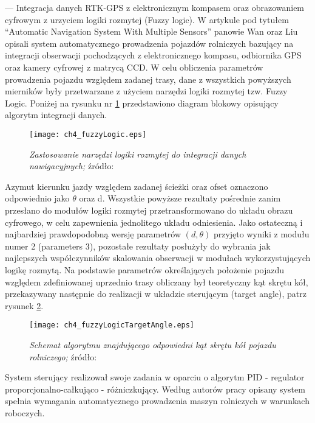 --- Integracja danych RTK-GPS z elektronicznym kompasem oraz obrazowaniem cyfrowym z urzyciem logiki rozmytej (Fuzzy logic).
W artykule pod tytułem “Automatic Navigation System With Multiple Sensors” panowie Wan oraz Liu
opisali system automatycznego prowadzenia pojazdów rolniczych bazujący na integracji obserwacji pochodzących z elektronicznego kompasu,
odbiornika GPS oraz kamery cyfrowej z matrycą CCD. W celu obliczenia parametrów prowadzenia pojazdu względem zadanej trasy,
dane z wszystkich powyższych mierników były przetwarzane z użyciem narzędzi logiki rozmytej tzw. Fuzzy Logic.
Poniżej na rysunku nr \ref{fig:ch4_fuzzyLogic} przedstawiono diagram blokowy opisujący algorytm integracji danych.
\begin{figure}[H]
\centering
\texttt{[image: ch4\_fuzzyLogic.eps]}
\caption{\textit{Zastosowanie narzędzi logiki rozmytej do integracji danych nawigacyjnych;}
źródło: \cite[][strona 774]{CCTA_769_775}}
\label{fig:ch4_fuzzyLogic}
\end{figure}

Azymut kierunku jazdy względem zadanej ścieżki oraz ofset oznaczono odpowiednio jako $\theta$ oraz d.
Wszystkie powyższe rezultaty pośrednie zanim przesłano do modułów logiki rozmytej przetransformowano do układu obrazu cyfrowego,
w celu zapewnienia jednolitego układu odniesienia. Jako ostateczną i najbardziej prawdopodobną wersję parametrów $(d, \theta )$
przyjęto wyniki z modułu numer 2 (parameters 3), pozostałe rezultaty posłużyły do wybrania jak najlepszych współczynników skalowania obserwacji
w modułach wykorzystujących logikę rozmytą. Na podstawie parametrów określających położenie pojazdu względem zdefiniowanej uprzednio trasy
obliczany był teoretyczny kąt skrętu kół, przekazywany następnie do realizacji w układzie sterującym (target angle), patrz rysunek \ref{fig:ch4_fuzzyLogicTargetAngle}.
\begin{figure}[H]
\centering
\texttt{[image: ch4\_fuzzyLogicTargetAngle.eps]}
\caption{\textit{Schemat algorytmu znajdującego odpowiedni kąt skrętu kół pojazdu rolniczego;}
	źródło: \cite[][strona 775]{CCTA_769_775}}
\label{fig:ch4_fuzzyLogicTargetAngle}
\end{figure}
System sterujący realizował swoje zadania w oparciu o algorytm PID - regulator proporcjonalno-całkująco - różniczkujący.
Według autorów pracy \cite{CCTA_769_775} opisany system spełnia wymagania automatycznego prowadzenia maszyn rolniczych w warunkach roboczych.
